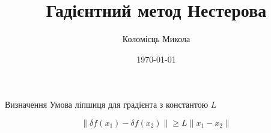 \documentclass[a4paper, 14pt]{beamer}
\title{Гадієнтний метод Нестерова}
\author{Коломієць Микола}
\date{\today}
\begin{document}
\maketitle

\begin{frame}

    \begin{statement}{Визначення}
        Умова ліпшиця для градієнта з константою $L$

        $$\|\delta f(x_1) - \delta f(x_2) \| \geq L \|x_1 - x_2 \| $$
    \end{statement}
    
\end{frame}
\end{document}
